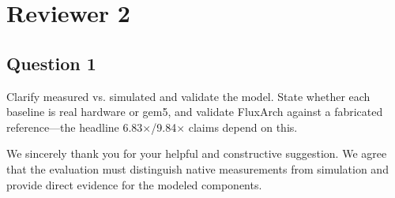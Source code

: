 \section{Reviewer 2}

\subsection{Question 1}
\begin{reviewcomment}
Clarify measured vs. simulated and validate the model. State whether each baseline is real hardware or gem5, and validate FluxArch against a fabricated reference---the headline 6.83$\times$/9.84$\times$ claims depend on this.
\end{reviewcomment}
We sincerely thank you for your helpful and constructive suggestion. We agree that the evaluation must distinguish native measurements from simulation and provide direct evidence for the modeled components.

